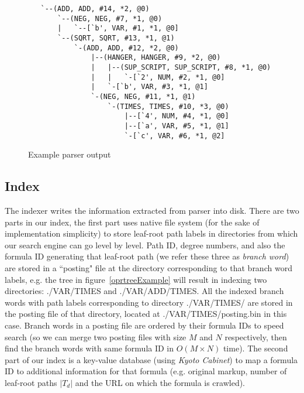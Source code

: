 \begin{figure}
\begin{center}
\begin{verbatim}
   `--(ADD, ADD, #14, *2, @0)
       `--(NEG, NEG, #7, *1, @0)
       |   `--[`b', VAR, #1, *1, @0]
       `--(SQRT, SQRT, #13, *1, @1)
           `-(ADD, ADD, #12, *2, @0)
               |--(HANGER, HANGER, #9, *2, @0)
               |   |--(SUP_SCRIPT, SUP_SCRIPT, #8, *1, @0)
               |   |   `-[`2', NUM, #2, *1, @0]
               |   `-[`b', VAR, #3, *1, @1]
               `-(NEG, NEG, #11, *1, @1)
                   `-(TIMES, TIMES, #10, *3, @0)
                       |--[`4', NUM, #4, *1, @0]
                       |--[`a', VAR, #5, *1, @1]
                       `-[`c', VAR, #6, *1, @2]
\end{verbatim}
\end{center}
\caption{Example parser output}\label{exout}
\end{figure}

\subsection{Index}
The indexer writes the information extracted from parser into disk. 
There are two parts in our index, the first part uses native file system (for the sake of implementation simplicity) to store leaf-root path labels in directories from which our search engine can go level by level. 
Path ID, degree numbers, and also the formula ID generating that leaf-root path (we refer these three as \textit{branch word}) are stored in a ``posting" file at the directory corresponding to that branch word labels, 
e.g. the tree in figure~\ref{oprtreeExample} will result in indexing two directories: ./VAR/TIMES and ./VAR/ADD/TIMES. 
All the indexed branch words with path labels corresponding to directory ./VAR/TIMES/ are stored in the posting file of that directory, located at ./VAR/TIMES/posting.bin in this case.
Branch words in a posting file are ordered by their formula IDs to speed search (so we can merge two posting files with size $M$ and $N$ respectively, then find the branch words with same formula ID in $O(M\times N)$ time).
The second part of our index is a key-value database (using \textit{Kyoto Cabinet}) to map a formula ID to additional information for that formula (e.g. original markup, number of leaf-root paths $|T_d|$ and the URL on which the formula is crawled).

